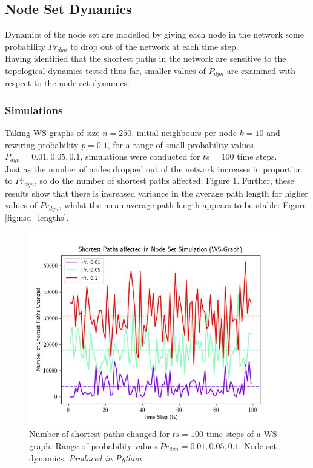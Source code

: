 \documentclass[
	a4paper, %
	10pt, %
	unnumberedsections, %
	twoside, %
]{LTJournalArticle}
\begin{document}
\subsection{Node Set Dynamics}
Dynamics of the node set are modelled by giving each node in the network some probability \(Pr_{dyn}\) to drop out of the network at each time step. \\

Having identified that the shortest paths in the network are sensitive to the topological dynamics tested thus far, smaller values of \(P_{dyn}\) are examined with respect to the node set dynamics. \\

\subsubsection{Simulations} 
Taking WS graphs of size \(n = 250\), initial neighbours per-node  \(k = 10\) and rewiring probability \(p = 0.1\), for a range of small probability values \(P_{dyn} = 0.01, 0.05, 0.1\), simulations were conducted for \(ts = 100\) time steps. \\

Just as the number of nodes dropped out of the network increases in proportion to \(Pr_{dyn}\), so do the number of shortest paths affected: Figure \ref{fig:nsd_paths}. Further, these results show that there is increased variance in the average path length for higher values of \(Pr_{dyn}\), whilst the mean average path length appears to be stable: Figure \ref{fig:nsd_lengths}. \\

\begin{figure}[H]
	\includegraphics[width=\linewidth]{Figures/nsd/NS_ex1_paths_mean.jpg}
	\caption{Number of shortest paths changed for \(ts = 100\) time-steps of a WS graph. Range of probability values \(Pr_{dyn} = 0.01, 0.05, 0.1\). Node set dynamics. \emph{Produced in Python}}
	\label{fig:nsd_paths}
\end{figure}
\end{document}
